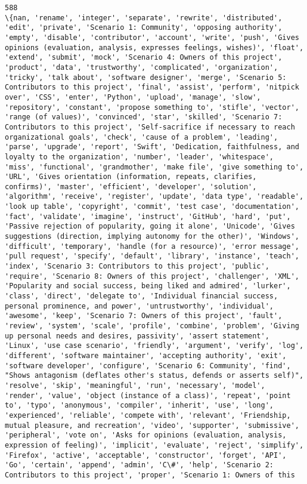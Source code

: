 \documentclass[11pt]{article}
\begin{document}
    \begin{Verbatim}[commandchars=\\\{\}]
588
\{nan, 'rename', 'integer', 'separate', 'rewrite', 'distributed', 'edit', 'private', 'Scenario 1: Community', 'opposing authority', 'empty', 'disable', 'contributor', 'account', 'write', 'push', 'Gives opinions (evaluation, analysis, expresses feelings, wishes)', 'float', 'extend', 'submit', 'mock', 'Scenario 4: Owners of this project', 'product', 'data', 'trustworthy', 'complicated', 'organization', 'tricky', 'talk about', 'software designer', 'merge', 'Scenario 5: Contributors to this project', 'final', 'assist', 'perform', 'nitpick over', 'CSS', 'enter', 'Python', 'upload', 'manage', 'slow', 'repository', 'constant', 'propose something to', 'stifle', 'vector', 'range (of values)', 'convinced', 'star', 'skilled', 'Scenario 7: Contributors to this project', 'Self-sacrifice if necessary to reach organizational goals', 'check', 'cause of a problem', 'leading', 'parse', 'upgrade', 'report', 'Swift', 'Dedication, faithfulness, and loyalty to the organization', 'number', 'leader', 'whitespace', 'miss', 'functional', 'grandmother', 'make file', 'give something to', 'URL', 'Gives orientation (information, repeats, clarifies, confirms)', 'master', 'efficient', 'developer', 'solution', 'algorithm', 'receive', 'register', 'update', 'data type', 'readable', 'look up table', 'copyright', 'commit', 'test case', 'documentation', 'fact', 'validate', 'imagine', 'instruct', 'GitHub', 'hard', 'put', 'Passive rejection of popularity, going it alone', 'Unicode', 'Gives suggestions (direction, implying autonomy for the other)', 'Windows', 'difficult', 'temporary', 'handle (for a resource)', 'error message', 'pull request', 'specify', 'default', 'library', 'instance', 'teach', 'index', 'Scenario 3: Contributors to this project', 'public', 'require', 'Scenario 8: Owners of this project', 'challenger', 'XML', 'Popularity and social success, being liked and admired', 'lurker', 'class', 'direct', 'delegate to', 'Individual financial success, personal prominence, and power', 'untrustworthy', 'individual', 'awesome', 'keep', 'Scenario 7: Owners of this project', 'fault', 'review', 'system', 'scale', 'profile', 'combine', 'problem', 'Giving up personal needs and desires, passivity', 'assert statement', 'Linux', 'use case scenario', 'friendly', 'argument', 'verify', 'log', 'different', 'software maintainer', 'accepting authority', 'exit', 'software developer', 'configure', 'Scenario 6: Community', 'find', "Shows antagonism (deflates other's status, defends or asserts self)", 'resolve', 'skip', 'meaningful', 'run', 'necessary', 'model', 'render', 'value', 'object (instance of a class)', 'repeat', 'point to', 'typo', 'anonymous', 'compiler', 'inherit', 'use', 'long', 'experienced', 'reliable', 'compete with', 'relevant', 'Friendship, mutual pleasure, and recreation', 'video', 'supporter', 'submissive', 'peripheral', 'vote on', 'Asks for opinions (evaluation, analysis, expression of feeling)', 'implicit', 'evaluate', 'reject', 'simplify', 'Firefox', 'active', 'acceptable', 'constructor', 'forget', 'API', 'Go', 'certain', 'append', 'admin', 'C\#', 'help', 'Scenario 2: Contributors to this project', 'proper', 'Scenario 1: Owners of this 
\end{Verbatim}
\end{document}
